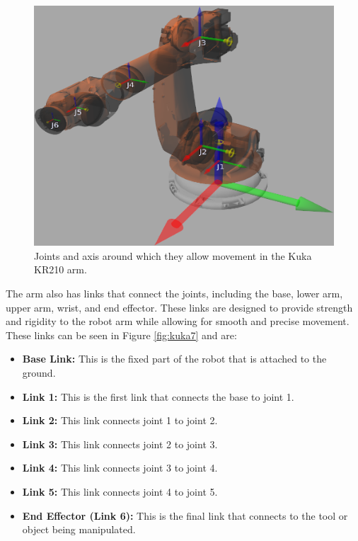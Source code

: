 \documentclass[12pt,oneside]{article}
\begin{document}
\begin{figure}[H]
	\centering
	\includegraphics[width=0.9\linewidth]{kuka5}
	\caption[Joints in the Kuka KR210.]{Joints and axis around which they allow movement in the Kuka KR210 arm.}
	\label{fig:kuka5}
\end{figure}

The arm also has links that connect the joints, including the base, lower arm, upper arm, wrist, and end effector. These links are designed to provide strength and rigidity to the robot arm while allowing for smooth and precise movement. These links can be seen in Figure \ref{fig:kuka7} and are:

\begin{itemize}
	\item \textbf{Base Link:} This is the fixed part of the robot that is attached to the ground.
	
	\item \textbf{Link 1:} This is the first link that connects the base to joint 1.
	
	\item \textbf{Link 2:} This link connects joint 1 to joint 2.
	
	\item \textbf{Link 3:} This link connects joint 2 to joint 3.
	
	\item \textbf{Link 4: }This link connects joint 3 to joint 4.
	
	\item \textbf{Link 5: }This link connects joint 4 to joint 5.
	
	\item \textbf{End Effector (Link 6):} This is the final link that connects to the tool or object being manipulated.
	
\end{itemize}
\end{document}
